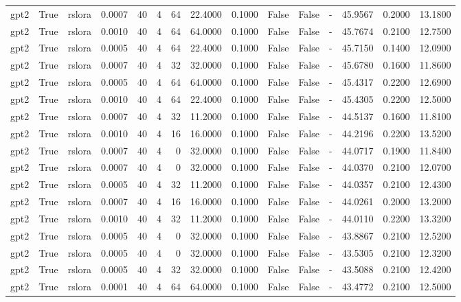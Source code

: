 \begin{tabular}{lrlrrrrrrlllrrr}
gpt2 & True & rslora & 0.0007 & 40 & 4 & 64 & 22.4000 & 0.1000 & False & False & - & 45.9567 & 0.2000 & 13.1800 \\
gpt2 & True & rslora & 0.0010 & 40 & 4 & 64 & 64.0000 & 0.1000 & False & False & - & 45.7674 & 0.2100 & 12.7500 \\
gpt2 & True & rslora & 0.0005 & 40 & 4 & 64 & 22.4000 & 0.1000 & False & False & - & 45.7150 & 0.1400 & 12.0900 \\
gpt2 & True & rslora & 0.0007 & 40 & 4 & 32 & 32.0000 & 0.1000 & False & False & - & 45.6780 & 0.1600 & 11.8600 \\
gpt2 & True & rslora & 0.0005 & 40 & 4 & 64 & 64.0000 & 0.1000 & False & False & - & 45.4317 & 0.2200 & 12.6900 \\
gpt2 & True & rslora & 0.0010 & 40 & 4 & 64 & 22.4000 & 0.1000 & False & False & - & 45.4305 & 0.2200 & 12.5000 \\
gpt2 & True & rslora & 0.0007 & 40 & 4 & 32 & 11.2000 & 0.1000 & False & False & - & 44.5137 & 0.1600 & 11.8100 \\
gpt2 & True & rslora & 0.0010 & 40 & 4 & 16 & 16.0000 & 0.1000 & False & False & - & 44.2196 & 0.2200 & 13.5200 \\
gpt2 & True & rslora & 0.0007 & 40 & 4 & 0 & 32.0000 & 0.1000 & False & False & - & 44.0717 & 0.1900 & 11.8400 \\
gpt2 & True & rslora & 0.0007 & 40 & 4 & 0 & 32.0000 & 0.1000 & False & False & - & 44.0370 & 0.2100 & 12.0700 \\
gpt2 & True & rslora & 0.0005 & 40 & 4 & 32 & 11.2000 & 0.1000 & False & False & - & 44.0357 & 0.2100 & 12.4300 \\
gpt2 & True & rslora & 0.0007 & 40 & 4 & 16 & 16.0000 & 0.1000 & False & False & - & 44.0261 & 0.2000 & 13.2000 \\
gpt2 & True & rslora & 0.0010 & 40 & 4 & 32 & 11.2000 & 0.1000 & False & False & - & 44.0110 & 0.2200 & 13.3200 \\
gpt2 & True & rslora & 0.0005 & 40 & 4 & 0 & 32.0000 & 0.1000 & False & False & - & 43.8867 & 0.2100 & 12.5200 \\
gpt2 & True & rslora & 0.0005 & 40 & 4 & 0 & 32.0000 & 0.1000 & False & False & - & 43.5305 & 0.2100 & 12.3200 \\
gpt2 & True & rslora & 0.0005 & 40 & 4 & 32 & 32.0000 & 0.1000 & False & False & - & 43.5088 & 0.2100 & 12.4200 \\
gpt2 & True & rslora & 0.0001 & 40 & 4 & 64 & 64.0000 & 0.1000 & False & False & - & 43.4772 & 0.2100 & 12.5000 \\

\end{tabular}
